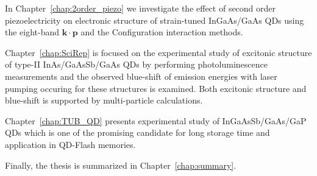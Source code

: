 \documentclass[
a4paper, %
11pt, %
onecolumn, %
openany, %
oldfontcommands,
]{memoir}
\begin{document}
In Chapter~\ref{chap:2order_piezo} we investigate the effect of second order piezoelectricity on electronic %
structure of strain-tuned InGaAs/GaAs QDs using the eight-band $\mathbf{k \cdot p}$ and the Configuration interaction methods.

Chapter~\ref{chap:SciRep} is focused on the experimental study of excitonic structure of type-II InAs/GaAsSb/GaAs QDs by performing photoluminescence measurements and the observed blue-shift of emission energies with laser pumping occuring for these structures is examined. Both excitonic structure and blue-shift is supported by multi-particle calculations.

Chapter~\ref{chap:TUB_QD} presents experimental study of InGaAsSb/GaAs/GaP QDs which is one of the promising candidate for long storage time and application in QD-Flash memories.  

Finally, the thesis is summarized in Chapter~\ref{chap:summary}.
\newpage 




\mainmatter

%






\appendix





%







\backmatter



%
%
%


\end{document}
